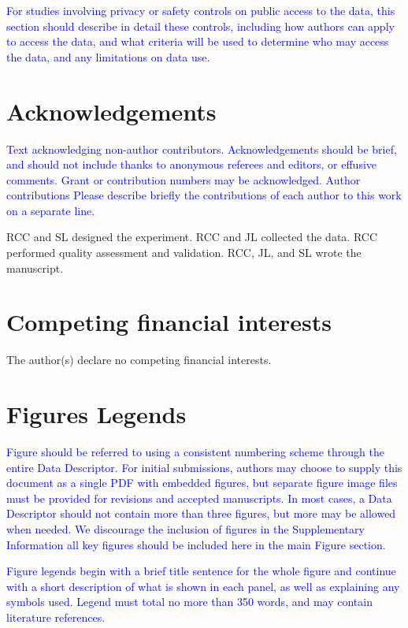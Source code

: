 \documentclass[english,11pt]{article}
\begin{document}
\textcolor{blue}{For studies involving privacy or safety controls on public access
to the data, this section should describe in detail these controls,
including how authors can apply to access the data, and what criteria
will be used to determine who may access the data, and any limitations
on data use. }


\section*{Acknowledgements }

\textcolor{blue}{Text acknowledging non-author contributors. Acknowledgements should
be brief, and should not include thanks to anonymous referees and
editors, or effusive comments. Grant or contribution numbers may be
acknowledged. Author contributions Please describe briefly the contributions
of each author to this work on a separate line. }


RCC and SL designed the experiment. RCC and JL collected the data. RCC performed 
quality assessment and validation. RCC, JL, and SL wrote the manuscript.

\section*{Competing financial interests }

The author(s) declare no competing financial interests.


\section*{Figures Legends}

\textcolor{blue}{Figure should be referred to using a consistent numbering scheme through
the entire Data Descriptor. For initial submissions, authors may choose
to supply this document as a single PDF with embedded figures, but
separate figure image files must be provided for revisions and accepted
manuscripts. In most cases, a Data Descriptor should not contain more
than three figures, but more may be allowed when needed. We discourage
the inclusion of figures in the Supplementary Information \textendash{}
all key figures should be included here in the main Figure section. }

\textcolor{blue}{Figure legends begin with a brief title sentence for the whole figure
and continue with a short description of what is shown in each panel,
as well as explaining any symbols used. Legend must total no more
than 350 words, and may contain literature references. }
\end{document}
